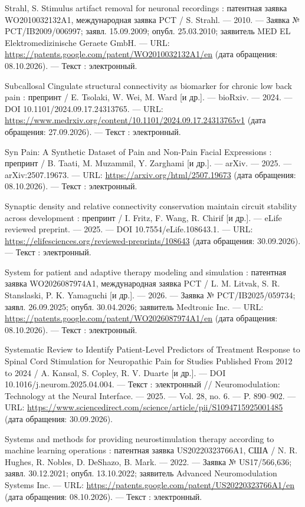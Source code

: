 \begin{list}{}{\setlength{\leftmargin}{10mm}\setlength{\labelwidth}{8mm}\setlength{\labelsep}{2mm}\setlength{\itemsep}{0pt}\setlength{\parsep}{0pt}\setlength{\topsep}{0pt}}
\item[259.] Strahl, S. Stimulus artifact removal for neuronal recordings : патентная заявка WO2010032132A1, международная заявка PCT / S. Strahl. — 2010. — Заявка № PCT/IB2009/006997; заявл. 15.09.2009; опубл. 25.03.2010; заявитель MED EL Elektromedizinische Geraete GmbH. — URL: \url{https://patents.google.com/patent/WO2010032132A1/en} (дата обращения: 08.10.2026). — Текст : электронный.
\item[260.] Subcallosal Cingulate structural connectivity as biomarker for chronic low back pain : препринт / E. Tsolaki, W. Wei, M. Ward [и др.]. — bioRxiv. — 2024. — DOI 10.1101/2024.09.17.24313765. — URL: \url{https://www.medrxiv.org/content/10.1101/2024.09.17.24313765v1} (дата обращения: 27.09.2026). — Текст : электронный.
\item[261.] Syn Pain: A Synthetic Dataset of Pain and Non-Pain Facial Expressions : препринт / B. Taati, M. Muzammil, Y. Zarghami [и др.]. — arXiv. — 2025. — arXiv:2507.19673. — URL: \url{https://arxiv.org/html/2507.19673} (дата обращения: 08.10.2026). — Текст : электронный.
\item[262.] Synaptic density and relative connectivity conservation maintain circuit stability across development : препринт / I. Fritz, F. Wang, R. Chirif [и др.]. — eLife reviewed preprint. — 2025. — DOI 10.7554/eLife.108643.1. — URL: \url{https://elifesciences.org/reviewed-preprints/108643} (дата обращения: 30.09.2026). — Текст : электронный.
\item[263.] System for patient and adaptive therapy modeling and simulation : патентная заявка WO2026087974A1, международная заявка PCT / L. M. Litvak, S. R. Stanslaski, P. K. Yamaguchi [и др.]. — 2026. — Заявка № PCT/IB2025/059734; заявл. 26.09.2025; опубл. 30.04.2026; заявитель Medtronic Inc. — URL: \url{https://patents.google.com/patent/WO2026087974A1/en} (дата обращения: 08.10.2026). — Текст : электронный.
\item[264.] Systematic Review to Identify Patient-Level Predictors of Treatment Response to Spinal Cord Stimulation for Neuropathic Pain for Studies Published From 2012 to 2024 / A. Kansal, S. Copley, R. V. Duarte [и др.]. — DOI 10.1016/j.neurom.2025.04.004. — Текст : электронный // Neuromodulation: Technology at the Neural Interface. — 2025. — Vol. 28, no. 6. — P. 890–902. — URL: \url{https://www.sciencedirect.com/science/article/pii/S1094715925001485} (дата обращения: 30.09.2026).
\item[265.] Systems and methods for providing neurostimulation therapy according to machine learning operations : патентная заявка US20220323766A1, США / N. R. Hughes, R. Nobles, D. DeShazo, B. Mark. — 2022. — Заявка № US17/566,636; заявл. 30.12.2021; опубл. 13.10.2022; заявитель Advanced Neuromodulation Systems Inc. — URL: \url{https://patents.google.com/patent/US20220323766A1/en} (дата обращения: 08.10.2026). — Текст : электронный.

\end{list}
